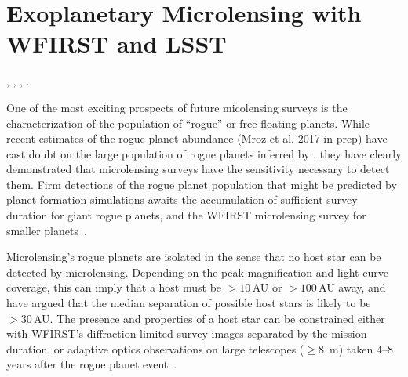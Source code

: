 %
%
%
%

\section{Exoplanetary Microlensing with WFIRST and LSST}
\def\secname{\chpname:microlensing}\label{sec:\secname}

,
,
,
.

One of the most exciting prospects of future micolensing surveys is the
characterization of the population of ``rogue'' or free-floating planets.
While recent estimates of the rogue planet abundance (Mroz et al. 2017 in prep)
 have cast doubt on the large population of rogue planets inferred by
\citet{2011Natur.473..349S}, they have clearly demonstrated that microlensing surveys
have the sensitivity necessary to detect them. Firm detections of the rogue
planet population that might be predicted by planet formation simulations
awaits the accumulation of sufficient survey duration for giant rogue planets,
and the WFIRST microlensing survey for smaller planets~\citep{2015arXiv150303757S,2017arXiv170408749B}.

Microlensing's rogue planets
are isolated in the sense that no host star can be detected
by microlensing. Depending on the peak magnification and light curve
coverage, this can imply that a host must be $> 10\,$AU or $> 100\,$AU away,
and \citet{2012ApJ...757..119B} have argued that the median separation
of possible host stars is likely to be $> 30\,$AU. The presence and properties
of a host star can be constrained either with WFIRST's diffraction limited survey images separated by the mission duration, or adaptive optics observations on large telescopes ($\ge 8$~m) taken $4$--$8$ years after the rogue planet event~\citep{2016JKAS...49..123G,2016AJ....152...96H}.

